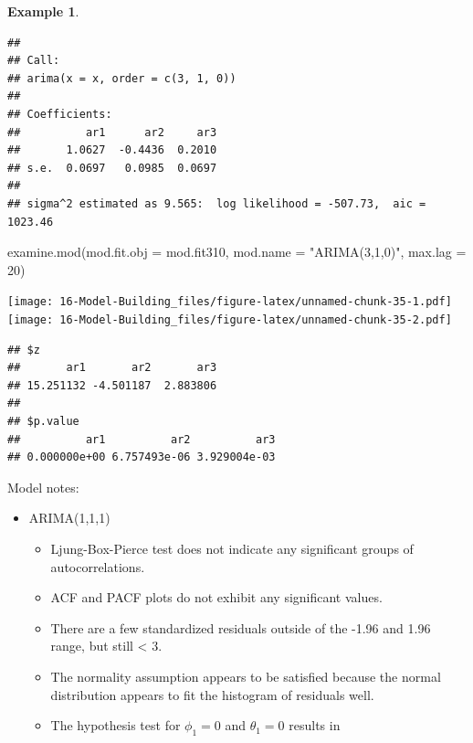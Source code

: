 \documentclass[
]{book}
\newenvironment{Shaded}{\begin{snugshade}}{\end{snugshade}}
\newcommand{\AttributeTok}[1]{\textcolor[rgb]{0.77,0.63,0.00}{#1}}
\newcommand{\DecValTok}[1]{\textcolor[rgb]{0.00,0.00,0.81}{#1}}
\newcommand{\FunctionTok}[1]{\textcolor[rgb]{0.00,0.00,0.00}{#1}}
\newcommand{\NormalTok}[1]{#1}
\newcommand{\StringTok}[1]{\textcolor[rgb]{0.31,0.60,0.02}{#1}}
\providecommand{\tightlist}{%
  \setlength{\itemsep}{0pt}\setlength{\parskip}{0pt}}
\theoremstyle{definition}
\theoremstyle{definition}
\newtheorem{example}{Example}[chapter]
\theoremstyle{definition}
\theoremstyle{definition}
\theoremstyle{remark}
\begin{document}
\begin{example}
\begin{verbatim}
## 
## Call:
## arima(x = x, order = c(3, 1, 0))
## 
## Coefficients:
##          ar1      ar2     ar3
##       1.0627  -0.4436  0.2010
## s.e.  0.0697   0.0985  0.0697
## 
## sigma^2 estimated as 9.565:  log likelihood = -507.73,  aic = 1023.46
\end{verbatim}

\begin{Shaded}
\begin{Highlighting}[]
\FunctionTok{examine.mod}\NormalTok{(}\AttributeTok{mod.fit.obj =}\NormalTok{ mod.fit310, }\AttributeTok{mod.name =} 
    \StringTok{"ARIMA(3,1,0)"}\NormalTok{, }\AttributeTok{max.lag =} \DecValTok{20}\NormalTok{)}
\end{Highlighting}
\end{Shaded}

\texttt{[image: 16-Model-Building\_files/figure-latex/unnamed-chunk-35-1.pdf]} \texttt{[image: 16-Model-Building\_files/figure-latex/unnamed-chunk-35-2.pdf]}

\begin{verbatim}
## $z
##       ar1       ar2       ar3 
## 15.251132 -4.501187  2.883806 
## 
## $p.value
##          ar1          ar2          ar3 
## 0.000000e+00 6.757493e-06 3.929004e-03
\end{verbatim}

\end{example}

Model notes:

\begin{itemize}
\tightlist
\item
  ARIMA(1,1,1)

  \begin{itemize}
  \tightlist
  \item
    Ljung-Box-Pierce test does not indicate any significant groups of autocorrelations.\\
  \item
    ACF and PACF plots do not exhibit any significant values.\\
  \item
    There are a few standardized residuals outside of the -1.96 and 1.96 range, but still \textless{} 3.
  \item
    The normality assumption appears to be satisfied because the normal distribution appears to fit the histogram of residuals well.\\
  \item
    The hypothesis test for \(\phi_1=0\) and \(\theta_1=0\) results in
  \end{itemize}
\end{itemize}
\end{document}
